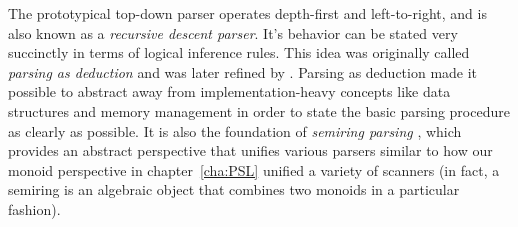 The prototypical top-down parser operates depth-first and left-to-right, and is also known as a \emph{recursive descent parser}.
It's behavior can be stated very succinctly in terms of logical inference rules.
This idea was originally called \emph{parsing as deduction} \citep{PereiraWarren83, Shieber.etal95} and was later refined by \citet{Sikkel97}.
Parsing as deduction made it possible to abstract away from implementation-heavy concepts like data structures and memory management in order to state the basic parsing procedure as clearly as possible.
It is also the foundation of \emph{semiring parsing} \citep{Goodman99}, which provides an abstract perspective that unifies various parsers similar to how our monoid perspective in chapter~\ref{cha:PSL} unified a variety of scanners (in fact, a semiring is an algebraic object that combines two monoids in a particular fashion).

